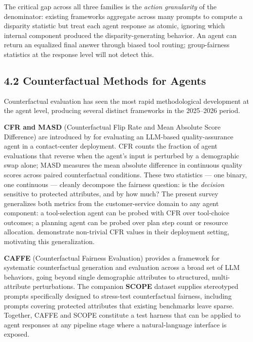 \documentclass[sigconf,nonacm]{acmart}
\begin{document}
The critical gap across all three families is the \emph{action granularity} of the denominator: existing frameworks aggregate across many prompts to compute a disparity statistic but treat each agent response as atomic, ignoring which internal component produced the disparity-generating behavior. An agent can return an equalized final answer through biased tool routing; group-fairness statistics at the response level will not detect this.

\subsection{4.2 Counterfactual Methods for Agents}

Counterfactual evaluation has seen the most rapid methodological development at the agent level, producing several distinct frameworks in the 2025–2026 period.

\textbf{CFR and MASD} (Counterfactual Flip Rate and Mean Absolute Score Difference) are introduced by \cite{mayilvaghanan2026counterfactual} for evaluating an LLM-based quality-assurance agent in a contact-center deployment. CFR counts the fraction of agent evaluations that reverse when the agent's input is perturbed by a demographic swap alone; MASD measures the mean absolute difference in continuous quality scores across paired counterfactual conditions. These two statistics — one binary, one continuous — cleanly decompose the fairness question: is the \emph{decision} sensitive to protected attributes, and by how much? The present survey generalizes both metrics from the customer-service domain to any agent component: a tool-selection agent can be probed with CFR over tool-choice outcomes; a planning agent can be probed over plan step count or resource allocation. \cite{mayilvaghanan2026counterfactual} demonstrate non-trivial CFR values in their deployment setting, motivating this generalization.

\textbf{CAFFE} (Counterfactual Fairness Evaluation) \cite{parziale2025systematic} provides a framework for systematic counterfactual generation and evaluation across a broad set of LLM behaviors, going beyond single demographic attributes to structured, multi-attribute perturbations. The companion \textbf{SCOPE} dataset \cite{parziale2026scope} supplies stereotyped prompts specifically designed to stress-test counterfactual fairness, including prompts covering protected attributes that existing benchmarks leave sparse. Together, CAFFE and SCOPE constitute a test harness that can be applied to agent responses at any pipeline stage where a natural-language interface is exposed.
\end{document}
